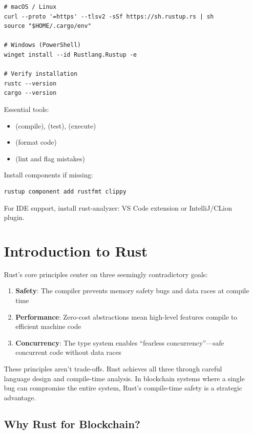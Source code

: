 \begin{verbatim}
# macOS / Linux
curl --proto '=https' --tlsv2 -sSf https://sh.rustup.rs | sh
source "$HOME/.cargo/env"

# Windows (PowerShell)
winget install --id Rustlang.Rustup -e

# Verify installation
rustc --version
cargo --version
\end{verbatim}

Essential tools:
\begin{itemize}
  \item {} (compile),  (test),  (execute)
  \item {} (format code)
  \item {} (lint and flag mistakes)
\end{itemize}

Install components if missing:
\begin{verbatim}
rustup component add rustfmt clippy
\end{verbatim}

For IDE support, install rust-analyzer: VS Code extension or IntelliJ/CLion plugin.

\section{Introduction to Rust}
\label{sec:ch24-intro}

Rust's core principles center on three seemingly contradictory goals:
\begin{enumerate}
  \item \textbf{Safety}: The compiler prevents memory safety bugs and data races at compile time
  \item \textbf{Performance}: Zero-cost abstractions mean high-level features compile to efficient machine code
  \item \textbf{Concurrency}: The type system enables ``fearless concurrency''---safe concurrent code without data races
\end{enumerate}

These principles aren't trade-offs. Rust achieves all three through careful language design and compile-time analysis. In blockchain systems where a single bug can compromise the entire system, Rust's compile-time safety is a strategic advantage.

\subsection{Why Rust for Blockchain?}
\label{subsec:ch24-why-rust}

